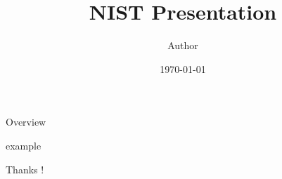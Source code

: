 \documentclass[aspectratio=169]{beamer}
\title{NIST Presentation}
\date[\today]{\today}
\author[Author]{Author}
\begin{document}
\begin{frame}[plain]
\titlepage
\end{frame}

\begin{frame}{Overview}
\tableofcontents
\end{frame}

{example}

\begin{frame}[plain]
  \centering
  \LARGE Thanks !
\end{frame}
\end{document}
